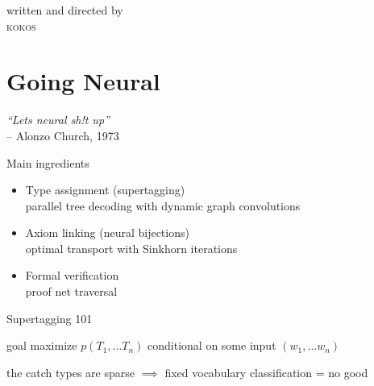 \documentclass{beamer}
\begin{document}
{%
\begin{frame}[plain]{}
\larger[2]
\vfill
\centering
\textcolor{teal!50}{
written and directed by\\
\textsc{kokos}
}
\vfill
\end{frame}
}

\section{Going Neural}

\begin{frame}
\flushright
\larger
\textit{``Lets neural sh!t up''}\\
\smaller
-- Alonzo Church, 1973

\vfill

\flushleft
\smaller[2]
\end{frame}


\begin{frame}{Main ingredients}
\smaller

\begin{itemize}
\item Type assignment (supertagging)\\
parallel tree decoding with dynamic graph convolutions
\item Axiom linking (neural bijections)\\
optimal transport with Sinkhorn iterations
\item Formal verification\\
proof net traversal
\end{itemize}
\end{frame}


\begin{frame}{Supertagging 101}
	\smaller
	
	\begin{block}{goal}
	maximize $p(T_1, \dots T_n)$ conditional on some input $(w_1,\dots w_n)$	
	\end{block}
	\vfill
	\pause
	\begin{block}{\alert{the catch}}
	types are sparse $\implies$ fixed vocabulary classification = no good
	\end{block}
\end{frame}
\end{document}

